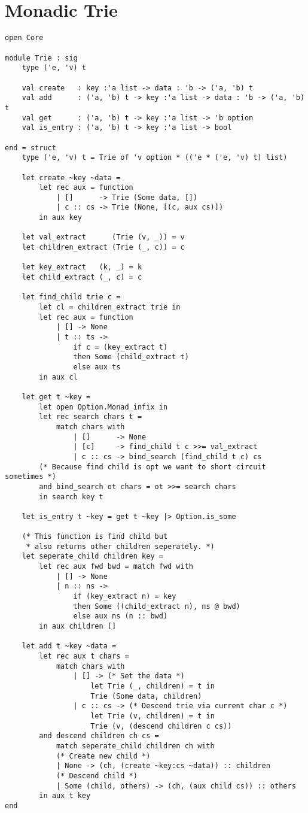 \section{\\Monadic Trie}
\begin{verbatim}
open Core

module Trie : sig
    type ('e, 'v) t

    val create   : key :'a list -> data : 'b -> ('a, 'b) t
    val add      : ('a, 'b) t -> key :'a list -> data : 'b -> ('a, 'b) t
    val get      : ('a, 'b) t -> key :'a list -> 'b option
    val is_entry : ('a, 'b) t -> key :'a list -> bool

end = struct
    type ('e, 'v) t = Trie of 'v option * (('e * ('e, 'v) t) list)

    let create ~key ~data =
        let rec aux = function
            | []      -> Trie (Some data, [])
            | c :: cs -> Trie (None, [(c, aux cs)])
        in aux key

    let val_extract      (Trie (v, _)) = v
    let children_extract (Trie (_, c)) = c

    let key_extract   (k, _) = k
    let child_extract (_, c) = c

    let find_child trie c =
        let cl = children_extract trie in
        let rec aux = function
            | [] -> None
            | t :: ts ->
                if c = (key_extract t)
                then Some (child_extract t)
                else aux ts
        in aux cl

    let get t ~key =
        let open Option.Monad_infix in
        let rec search chars t =
            match chars with
                | []      -> None
                | [c]     -> find_child t c >>= val_extract
                | c :: cs -> bind_search (find_child t c) cs
        (* Because find child is opt we want to short circuit sometimes *)
        and bind_search ot chars = ot >>= search chars
        in search key t

    let is_entry t ~key = get t ~key |> Option.is_some

    (* This function is find child but
     * also returns other children seperately. *)
    let seperate_child children key =
        let rec aux fwd bwd = match fwd with
            | [] -> None
            | n :: ns ->
                if (key_extract n) = key
                then Some ((child_extract n), ns @ bwd)
                else aux ns (n :: bwd)
        in aux children []

    let add t ~key ~data =
        let rec aux t chars =
            match chars with
                | [] -> (* Set the data *)
                    let Trie (_, children) = t in
                    Trie (Some data, children)
                | c :: cs -> (* Descend trie via current char c *)
                    let Trie (v, children) = t in
                    Trie (v, (descend children c cs))
        and descend children ch cs =
            match seperate_child children ch with
            (* Create new child *)
            | None -> (ch, (create ~key:cs ~data)) :: children
            (* Descend child *)
            | Some (child, others) -> (ch, (aux child cs)) :: others
        in aux t key
end
\end{verbatim}
